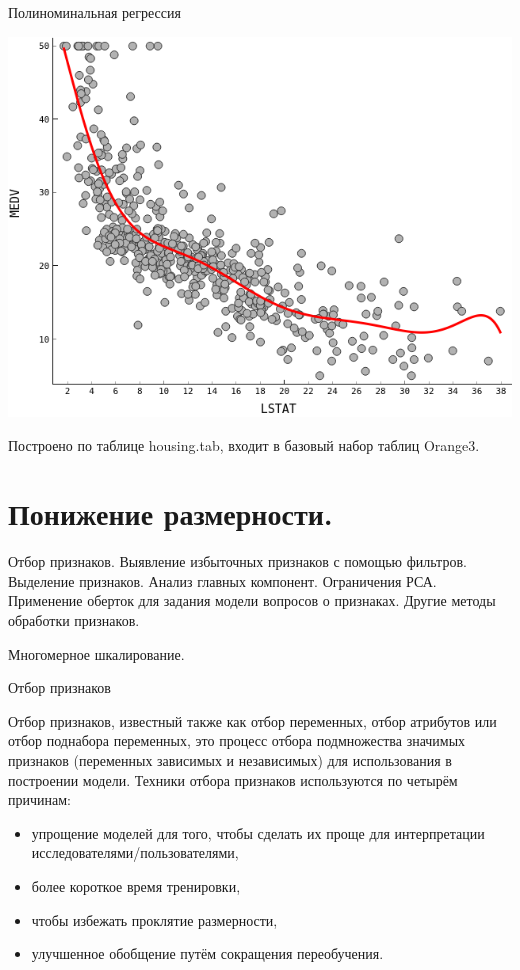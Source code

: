 \documentclass{beamer}
\begin{document}
\begin{frame}{Полиноминальная регрессия}

\includegraphics[scale=0.5]{ris_05.png}

Построено по таблице housing.tab, входит в базовый набор таблиц Orange3.
\end{frame}


\section{Понижение размерности.}

\begin{frame}
Отбор признаков. Выявление избыточных признаков с помощью фильтров.  Выделение признаков. 
Анализ главных компонент. Ограничения РСА. 
Применение оберток для задания модели вопросов о признаках. Другие методы обработки признаков.


Многомерное шкалирование.
\end{frame}


\begin{frame}{Отбор признаков}

Отбор признаков, известный также как отбор переменных, отбор атрибутов или отбор поднабора переменных, это процесс отбора подмножества значимых признаков (переменных зависимых и независимых) для использования в построении модели. Техники отбора признаков используются по четырём причинам:
\begin{itemize}


  \item упрощение моделей для того, чтобы сделать их проще для интерпретации исследователями/пользователями,
   \item    более короткое время тренировки,
   \item    чтобы избежать проклятие размерности,
   \item    улучшенное обобщение путём сокращения переобучения.
\end{itemize}
\end{frame}
\end{document}
